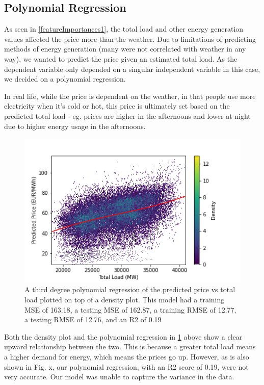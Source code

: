 \documentclass[10pt]{article}
\begin{document}
\subsection{Polynomial Regression}

As seen in \ref{featureImportances1}, the total load and other energy generation values affected the price more than the weather. Due to limitations of predicting methods of energy generation (many were not correlated with weather in any way), we wanted to predict the price given an estimated total load. As the dependent variable only depended on a singular independent variable in this case, we decided on a polynomial regression. 

In real life, while the price is dependent on the weather, in that people use more electricity when it’s cold or hot, this price is ultimately set based on the predicted total load - eg. prices are higher in the afternoons and lower at night due to higher energy usage in the afternoons. 

\begin{figure}[H]
    \centering
    \includegraphics[scale=0.55]{polynomial_regression.png}
    \caption{A third degree polynomial regression of the predicted price vs total load plotted on top of a density plot. This model had a training MSE of 163.18, a testing MSE of 162.87, a training RMSE of 12.77, a testing RMSE of 12.76, and an R2 of 0.19}
    \label{polyreg}
\end{figure}

Both the density plot and the polynomial regression in \ref{polyreg} above show a clear upward relationship between the two. This is because a greater total load means a higher demand for energy, which means the prices go up. However, as is also shown in Fig. x, our polynomial regression, with an R2 score of 0.19, were not very accurate. Our model was unable to capture the variance in the data.  
\end{document}
